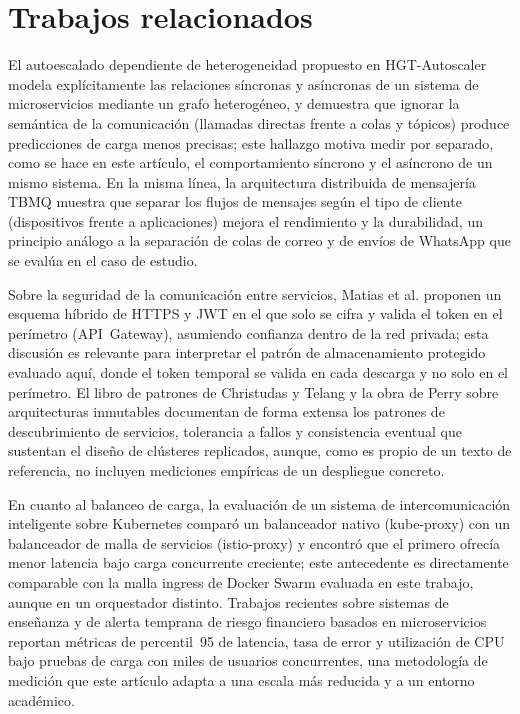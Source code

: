 \section{Trabajos relacionados}

El autoescalado dependiente de heterogeneidad propuesto en HGT-Autoscaler
\cite{ref1} modela explícitamente las relaciones síncronas y asíncronas de un
sistema de microservicios mediante un grafo heterogéneo, y demuestra que
ignorar la semántica de la comunicación (llamadas directas frente a colas y
tópicos) produce predicciones de carga menos precisas; este hallazgo motiva
medir por separado, como se hace en este artículo, el comportamiento síncrono
y el asíncrono de un mismo sistema. En la misma línea, la arquitectura
distribuida de mensajería TBMQ \cite{ref2} muestra que separar los flujos de
mensajes según el tipo de cliente (dispositivos frente a aplicaciones) mejora
el rendimiento y la durabilidad, un principio análogo a la separación de
colas de correo y de envíos de WhatsApp que se evalúa en el caso de estudio.

Sobre la seguridad de la comunicación entre servicios, Matias et al.
\cite{ref3} proponen un esquema híbrido de HTTPS y JWT en el que solo se
cifra y valida el token en el perímetro (API~Gateway), asumiendo confianza
dentro de la red privada; esta discusión es relevante para interpretar el
patrón de almacenamiento protegido evaluado aquí, donde el token temporal se
valida en cada descarga y no solo en el perímetro. El libro de patrones de
Christudas y Telang \cite{ref4} y la obra de Perry sobre arquitecturas
inmutables \cite{ref5} documentan de forma extensa los patrones de
descubrimiento de servicios, tolerancia a fallos y consistencia eventual que
sustentan el diseño de clústeres replicados, aunque, como es propio de un
texto de referencia, no incluyen mediciones empíricas de un despliegue
concreto.

En cuanto al balanceo de carga, la evaluación de un sistema de
intercomunicación inteligente sobre Kubernetes \cite{ref6} comparó un
balanceador nativo (kube-proxy) con un balanceador de malla de servicios
(istio-proxy) y encontró que el primero ofrecía menor latencia bajo carga
concurrente creciente; este antecedente es directamente comparable con la
malla ingress de Docker Swarm evaluada en este trabajo, aunque en un
orquestador distinto. Trabajos recientes sobre sistemas de enseñanza
\cite{ref7} y de alerta temprana de riesgo financiero \cite{ref8} basados en
microservicios reportan métricas de percentil~95 de latencia, tasa de error y
utilización de CPU bajo pruebas de carga con miles de usuarios concurrentes,
una metodología de medición que este artículo adapta a una escala más
reducida y a un entorno académico.


